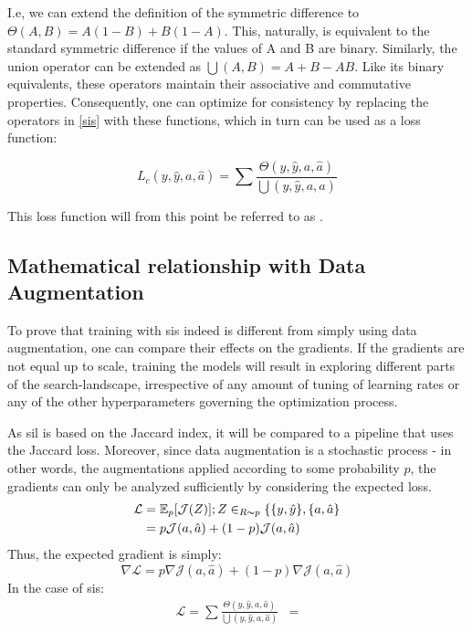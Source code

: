 I.e, we can extend the definition of the symmetric difference to \(\Theta(A,B) = A(1-B) + B(1-A)\). This, naturally, is equivalent to the standard symmetric difference if the values of A and B are binary. Similarly, the union operator can be extended as \( \bigcup(A,B) = A+B-AB\). Like its binary equivalents, these operators maintain their associative and commutative properties. Consequently, one can optimize for consistency by replacing the operators in \ref{sis} with these functions, which in turn can be used as a loss function:

\begin{equation}
    L_c(y, \hat{y},  a, \hat{a}) = \sum \frac{\Theta(y, \hat{y},  a, \hat{a})}{\bigcup(y, \hat{y},  a, \hat{a})}
\end{equation}

This loss function will from this point be referred to as . 

\subsection{Mathematical relationship with Data Augmentation}
To prove that training with \gls{sis} indeed is different from simply using data augmentation, one can compare their effects on the gradients. If the gradients are not equal up to scale, training the models will result in exploring different parts of the search-landscape, irrespective of any amount of tuning of learning rates or any of the other hyperparameters governing the optimization process. 

As \gls{sil} is based on the Jaccard index, it will be compared to a pipeline that uses the Jaccard loss. Moreover, since data augmentation is a stochastic process - in other words, the augmentations applied according to some probability \(p\), the gradients can only be analyzed sufficiently by considering the expected loss. 
\begin{align*}
    \mathcal{L} &= \mathbb{E}_p[\mathcal{J}(Z)]; Z \in_{R \thicksim p} \{ \{y, \hat{y}\},\{a, \hat{a}\}\\
    &= p\mathcal{J}(a, \hat{a})+ (1-p)\mathcal{J}(a, \hat{a})
\end{align*}
Thus, the expected gradient is simply:
\begin{equation}
    \nabla \mathcal{L} = p \nabla \mathcal{J}(a, \hat{a})+ (1-p)\nabla \mathcal{J}(a, \hat{a})
\end{equation}
In the case of \gls{sis}:
\begin{align*}
    \mathcal{L} = \sum \frac{\Theta(y, \hat{y},  a, \hat{a})}{\bigcup(y, \hat{y},  a, \hat{a})}
    &=
\end{align*}

